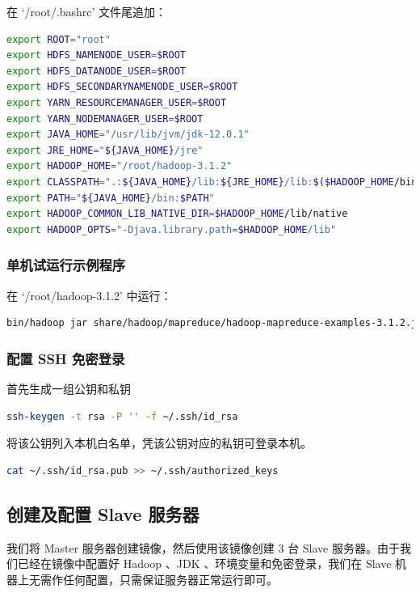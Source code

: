 \documentclass{article}
\begin{document}
在 `/root/.bashrc' 文件尾追加：

\begin{lstlisting}[language=bash]
export ROOT="root"
export HDFS_NAMENODE_USER=$ROOT
export HDFS_DATANODE_USER=$ROOT
export HDFS_SECONDARYNAMENODE_USER=$ROOT
export YARN_RESOURCEMANAGER_USER=$ROOT
export YARN_NODEMANAGER_USER=$ROOT
export JAVA_HOME="/usr/lib/jvm/jdk-12.0.1"
export JRE_HOME="${JAVA_HOME}/jre"
export HADOOP_HOME="/root/hadoop-3.1.2"
export CLASSPATH=".:${JAVA_HOME}/lib:${JRE_HOME}/lib:$($HADOOP_HOME/bin/hadoop classpath)"
export PATH="${JAVA_HOME}/bin:$PATH"
export HADOOP_COMMON_LIB_NATIVE_DIR=$HADOOP_HOME/lib/native
export HADOOP_OPTS="-Djava.library.path=$HADOOP_HOME/lib"
\end{lstlisting}

\subsubsection{单机试运行示例程序}

在 `/root/hadoop-3.1.2' 中运行：

\begin{lstlisting}[language=bash]
bin/hadoop jar share/hadoop/mapreduce/hadoop-mapreduce-examples-3.1.2.jar grep input output 'dfs[a-z.]+'
\end{lstlisting}

\subsubsection{配置 SSH 免密登录}

首先生成一组公钥和私钥

\begin{lstlisting}[language=bash]
ssh-keygen -t rsa -P '' -f ~/.ssh/id_rsa
\end{lstlisting}

将该公钥列入本机白名单，凭该公钥对应的私钥可登录本机。

\begin{lstlisting}[language=bash]
cat ~/.ssh/id_rsa.pub >> ~/.ssh/authorized_keys
\end{lstlisting}

\subsection{创建及配置 Slave 服务器}

我们将 Master 服务器创建镜像，然后使用该镜像创建 $3$ 台 Slave 服务器。由于我们已经在镜像中配置好 Hadoop 、JDK 、环境变量和免密登录，我们在 Slave 机器上无需作任何配置，只需保证服务器正常运行即可。
\end{document}
